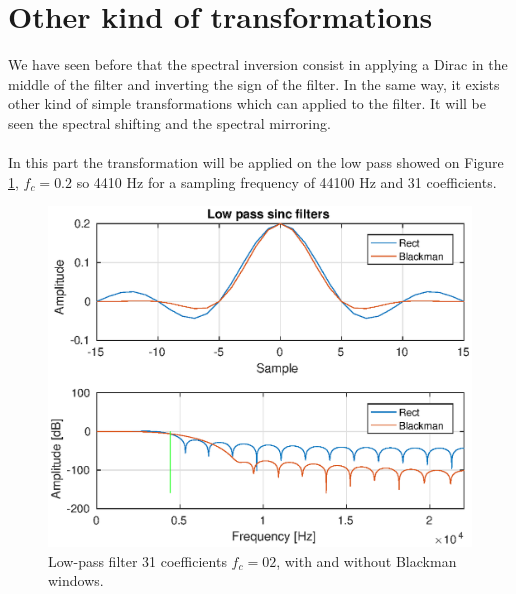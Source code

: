 \documentclass[twoside,twocolumn]{article}
\begin{document}
\section{Other kind of transformations}
We have seen before that the spectral inversion consist in applying a Dirac in the middle of the filter and inverting the sign of the filter. In the same way, it exists other kind of simple transformations which can applied to the filter. It will be seen  the spectral shifting and the spectral mirroring.\\ \\
 In this part the transformation will be applied on the low pass showed on Figure \ref{lowpass}, $f_c=0.2$ so 4410 Hz for a sampling frequency of 44100 Hz and 31 coefficients. 
 \begin{figure}[h!]
 	\centering
 	\includegraphics[scale=0.5]{./images/basetrans.eps}
 	\caption{Low-pass filter 31 coefficients $f_{c}=02$, with and without Blackman windows.}
 	\label{lowpass}
 \end{figure}
  
\end{document}
